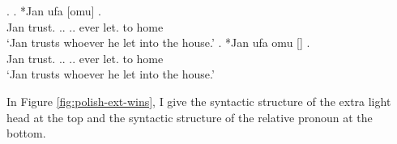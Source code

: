 \ex.\label{ex:polish-dat-acc-rep}
\ag. *Jan ufa [omu]     .\\
Jan trust.\scsub{[dat]} .. .. ever let.\scsub{[acc]} to home\\
`Jan trusts whoever he let into the house.' \label{ex:polish-dat-acc-rel}
\bg. *Jan ufa omu []    .\\
Jan trust.\scsub{[dat]} .. .. ever let.\scsub{[acc]} to home\\
`Jan trusts whoever he let into the house.' \label{ex:polish-dat-acc-lh}

In Figure \ref{fig:polish-ext-wins}, I give the syntactic structure of the extra light head at the top and the syntactic structure of the relative pronoun at the bottom.

